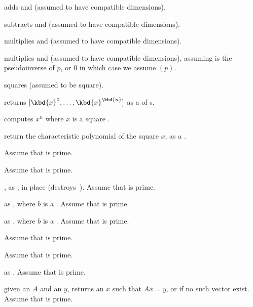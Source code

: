  adds  and 
(assumed to have compatible dimensions).

 subtracts  and 
(assumed to have compatible dimensions).

 multiplies   and 
(assumed to have compatible dimensions).

 multiplies   and
 (assumed to have compatible dimensions), assuming  is the
pseudoinverse of $p$, or $0$ in which case we assume $(p)$.

 squares 
(assumed to be square).

 returns
$[\kbd{x}^0, \dots, \kbd{x}^\kbd{n}]$ as a  of s.

 computes $x^n$ where $x$ is a
square .

 return the characteristic polynomial of
the square  $x$, as a .

 Assume that  is prime.

 Assume that  is prime.

, as , in place
(destroys~). Assume that  is prime.


 as , where $b$ is a
. Assume that  is prime.

 as , where $b$ is
a . Assume that  is prime.

 Assume that  is prime.

 Assume that  is prime.

 as . Assume that
 is prime.

 given an 
$A$ and an  $y$, returns an $x$ such that $Ax = y$, or 
if no such vector exist. Assume that  is prime.

